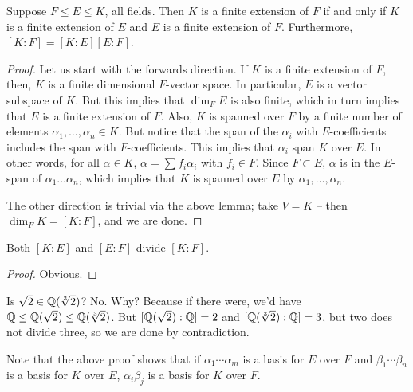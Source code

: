 \documentclass{../mathnotes}
\begin{document}
\begin{thm}
    Suppose $F\leq E\leq K$, all fields. Then $K$ is a finite extension of $F$ if and only if $K$ is a finite extension of $E$
    and $E$ is a finite extension of $F$. Furthermore, $[K:F]=[K:E][E:F]$.
\end{thm}
\begin{proof}
    Let us start with the forwards direction. If $K$ is a finite extension of $F$, then, $K$ is a finite dimensional $F$-vector space.
    In particular, $E$ is a vector subspace of $K$. But this implies that $\dim_F E$ is also finite, which in turn implies that
    $E$ is a finite extension of $F$. Also, $K$ is spanned over $F$ by a finite number of elements $\alpha_1,\ldots, \alpha_n\in K$.
    But notice that the span of the $\alpha_i$ with $E$-coefficients includes the span with $F$-coefficients. This implies that
    $\alpha_i$ span $K$ over $E$. In other words, for all $\alpha\in K$, $\alpha=\sum f_i\alpha_i$ with $f_i\in F$. Since $F\subset E$,
    $\alpha$ is in the $E$-span of $\alpha_1\ldots \alpha_n$, which implies that $K$ is spanned over $E$ by $\alpha_1, \ldots, \alpha_n$.

    The other direction is trivial via the above lemma; take $V=K$ -- then $\dim_FK=[K:F]$, and we are done.
\end{proof}

\begin{cor}
    Both $[K:E]$ and $[E:F]$ divide $[K:F]$.
\end{cor}
\begin{proof}
    Obvious.
\end{proof}

\begin{exmp}
    Is $\sqrt{2}\in\mathbb{Q}(\sqrt[3]{2})$? No. Why? Because if there were, we'd have
    $\mathbb{Q}\leq\mathbb{Q}(\sqrt{2})\leq\mathbb{Q}(\sqrt[3]{2})$. But $[\mathbb{Q}(\sqrt{2}):\mathbb{Q}]=2$ and $[\mathbb{Q}(\sqrt[3]{2}):\mathbb{Q}]=3$, but two does not divide three,
    so we are done by contradiction.
\end{exmp}

Note that the above proof shows that if  $\alpha_1\cdots\alpha_m$ is a basis for $E$ over $F$ and $\beta_1\cdots\beta_n$ is a basis 
for $K$ over $E$, $\alpha_i\beta_j$ is a basis for $K$ over $F$.
\end{document}

